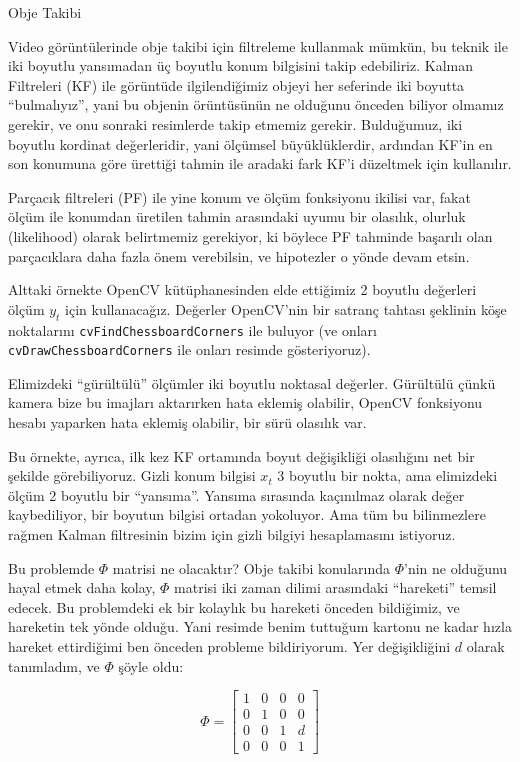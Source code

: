 \documentclass[12pt,fleqn]{article}\usepackage{../../common}
\begin{document}
Obje Takibi

Video görüntülerinde obje takibi için filtreleme kullanmak mümkün, bu
teknik ile iki boyutlu yansımadan üç boyutlu konum bilgisini takip
edebiliriz. Kalman Filtreleri (KF) ile görüntüde ilgilendiğimiz objeyi her
seferinde iki boyutta ``bulmalıyız'', yani bu objenin örüntüsünün ne
olduğunu önceden biliyor olmamız gerekir, ve onu sonraki resimlerde takip
etmemiz gerekir. Bulduğumuz, iki boyutlu kordinat değerleridir, yani
ölçümsel büyüklüklerdir, ardından KF'in en son konumuna göre ürettiği
tahmin ile aradaki fark KF'i düzeltmek için kullanılır.

Parçacık filtreleri (PF) ile yine konum ve ölçüm fonksiyonu ikilisi var,
fakat ölçüm ile konumdan üretilen tahmin arasındaki uyumu bir olasılık,
olurluk (likelihood) olarak belirtmemiz gerekiyor, ki böylece PF tahminde
başarılı olan parçacıklara daha fazla önem verebilsin, ve hipotezler o
yönde devam etsin. 

Alttaki örnekte OpenCV kütüphanesinden elde ettiğimiz 2 boyutlu değerleri
ölçüm $y_t$ için kullanacağız. Değerler OpenCV'nin bir satranç tahtası
şeklinin köşe noktalarını \verb!cvFindChessboardCorners! ile buluyor (ve
onları \verb!cvDrawChessboardCorners! ile onları resimde gösteriyoruz).

Elimizdeki ``gürültülü'' ölçümler iki boyutlu noktasal değerler. Gürültülü çünkü
kamera bize bu imajları aktarırken hata eklemiş olabilir, OpenCV fonksiyonu
hesabı yaparken hata eklemiş olabilir, bir sürü olasılık var.

Bu örnekte, ayrıca, ilk kez KF ortamında boyut değişikliği olasılığını net bir
şekilde görebiliyoruz. Gizli konum bilgisi $x_t$ 3 boyutlu bir nokta, ama
elimizdeki ölçüm 2 boyutlu bir ``yansıma''. Yansıma sırasında kaçınılmaz olarak
değer kaybediliyor, bir boyutun bilgisi ortadan yokoluyor. Ama tüm bu
bilinmezlere rağmen Kalman filtresinin bizim için gizli bilgiyi hesaplamasını
istiyoruz.

Bu problemde $\Phi$ matrisi ne olacaktır? Obje takibi konularında $\Phi$'nin ne
olduğunu hayal etmek daha kolay, $\Phi$ matrisi iki zaman dilimi arasındaki
``hareketi'' temsil edecek. Bu problemdeki ek bir kolaylık bu hareketi önceden
bildiğimiz, ve hareketin tek yönde olduğu. Yani resimde benim tuttuğum kartonu
ne kadar hızla hareket ettirdiğimi ben önceden probleme bildiriyorum. Yer
değişikliğini $d$ olarak tanımladım, ve $\Phi$ şöyle oldu:

$$ 
\Phi = 
\left[\begin{array}{rrrr}
1 & 0 & 0 & 0 \\
0 & 1 & 0 & 0 \\
0 & 0 & 1 & d \\
0 & 0 & 0 & 1
\end{array}\right]
$$
\end{document}
